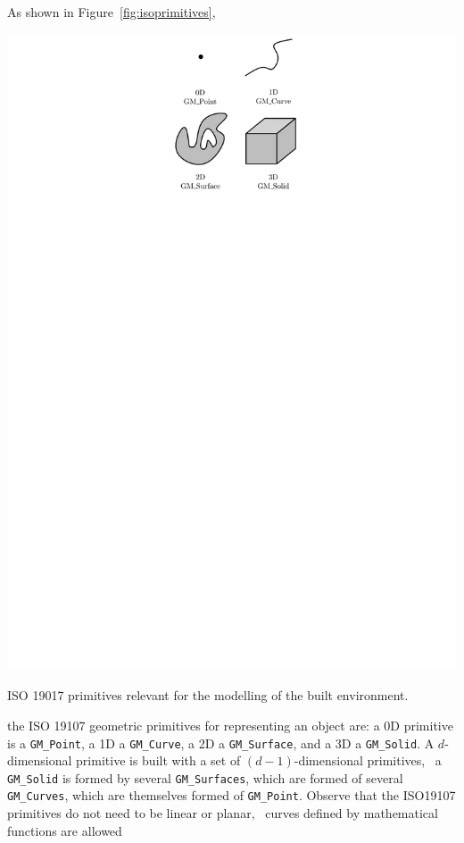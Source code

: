 As shown in Figure~\ref{fig:isoprimitives}, 
\begin{marginfigure}
  \centering
  \includegraphics[width=\linewidth]{figs/isoprimitives.pdf}
  \caption{ISO 19017 primitives relevant for the modelling of the built environment.}%
\label{fig:isoprimitives}
\end{marginfigure}
the ISO 19107 geometric primitives for representing an object are: a 0D primitive is a \texttt{GM\_Point}, a 1D a \texttt{GM\_Curve}, a 2D a \texttt{GM\_Surface}, and a 3D a \texttt{GM\_Solid}.
A $d$-dimensional primitive is built with a set of $(d-1)$-dimensional primitives, \eg\ a \texttt{GM\_Solid} is formed by several \texttt{GM\_Surfaces}, which are formed of several \texttt{GM\_Curves}, which are themselves formed of \texttt{GM\_Point}.
Observe that the ISO19107 primitives do not need to be linear or planar, \ie\ curves defined by mathematical functions are allowed

